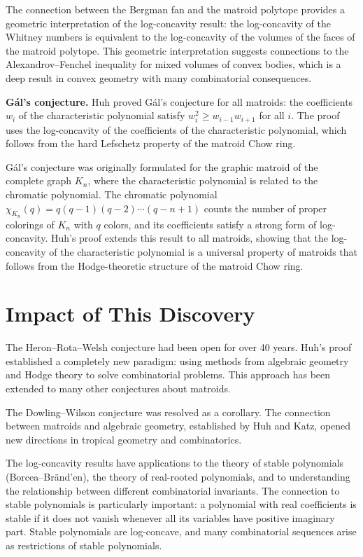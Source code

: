 The connection between the Bergman fan and the matroid polytope provides a geometric interpretation of the log-concavity result: the log-concavity of the Whitney numbers is equivalent to the log-concavity of the volumes of the faces of the matroid polytope. This geometric interpretation suggests connections to the Alexandrov--Fenchel inequality for mixed volumes of convex bodies, which is a deep result in convex geometry with many combinatorial consequences.

\textbf{G\'al's conjecture.} Huh proved G\'al's conjecture for all matroids: the coefficients $w_i$ of the characteristic polynomial satisfy $w_i^2 \ge w_{i-1} w_{i+1}$ for all $i$. The proof uses the log-concavity of the coefficients of the characteristic polynomial, which follows from the hard Lefschetz property of the matroid Chow ring.

G\'al's conjecture was originally formulated for the graphic matroid of the complete graph $K_n$, where the characteristic polynomial is related to the chromatic polynomial. The chromatic polynomial $\chi_{K_n}(q) = q(q-1)(q-2)\cdots(q-n+1)$ counts the number of proper colorings of $K_n$ with $q$ colors, and its coefficients satisfy a strong form of log-concavity. Huh's proof extends this result to all matroids, showing that the log-concavity of the characteristic polynomial is a universal property of matroids that follows from the Hodge-theoretic structure of the matroid Chow ring.

\section{Impact of This Discovery}

The Heron--Rota--Welsh conjecture had been open for over 40 years. Huh's proof established a completely new paradigm: using methods from algebraic geometry and Hodge theory to solve combinatorial problems. This approach has been extended to many other conjectures about matroids.

The Dowling--Wilson conjecture was resolved as a corollary. The connection between matroids and algebraic geometry, established by Huh and Katz, opened new directions in tropical geometry and combinatorics.

The log-concavity results have applications to the theory of stable polynomials (Borcea--Br\"and'en), the theory of real-rooted polynomials, and to understanding the relationship between different combinatorial invariants. The connection to stable polynomials is particularly important: a polynomial with real coefficients is stable if it does not vanish whenever all its variables have positive imaginary part. Stable polynomials are log-concave, and many combinatorial sequences arise as restrictions of stable polynomials.

